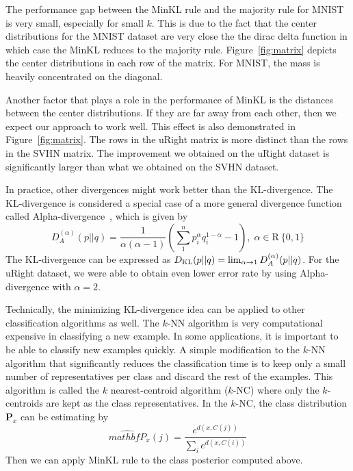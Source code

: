 \documentclass{article}
\begin{document}
The performance gap between the MinKL rule and the majority rule for
MNIST is very small, especially for small $k$. This is due to the fact that the center
distributions for the MNIST dataset are very close the the dirac delta
function in which case the MinKL reduces to the majority
rule. Figure~\ref{fig:matrix} depicts the center distributions in each
row of the matrix. For MNIST, the mass is heavily concentrated on the
diagonal.

Another factor that plays a role in the performance of MinKL is the
distances between the center distributions. If they are far away from
each other, then we expect our approach to work well. This effect is
also demonstrated in Figure~\ref{fig:matrix}. The rows in the uRight
matrix is more distinct than the rows in the SVHN matrix. The
improvement we obtained on the uRight dataset is significantly larger
than what we obtained on the SVHN dataset.

In practice, other divergences might work better than the
KL-divergence. The KL-divergence is considered a special case of a
more general divergence function called
Alpha-divergence~\cite{Cichocki2010}, which is given by
\[
D^{(\alpha)}_A (p||q) = \frac{1}{\alpha(\alpha - 1)}\left( \sum_1^n
  p^{\alpha}_i q^{1-\alpha}_i - 1\right), \; \alpha \in \mathrm{R} \ \{0,1\}
\]
The KL-divergence can be expressed as $D_{\mathrm{KL}}(p || q) = \lim_{\alpha
  \rightarrow 1} D^{(\alpha)}_A (p || q)$.  For the uRight dataset, we
were able to obtain even lower error rate by using Alpha-divergence
with $\alpha = 2$.

Technically, the minimizing KL-divergence idea can be applied to other
classification algorithms as well. The $k$-NN algorithm is very
computational expensive in classifying a new example. In some
applications, it is important to be able to classify new examples
quickly. A simple modification to the $k$-NN algorithm that
significantly reduces the classification time is to keep only a small
number of representatives per class and discard the rest of the
examples. This algorithm is called the $k$ nearest-centroid algorithm
($k$-NC) where only the $k$-centroids are kept as the class
representatives. In the $k$-NC, the class distribution $\mathbf{P}_x$
can be estimating by
\[
\widehat{mathbf{P}}_x(j) = \frac{e^{d(x,C(j))}}{\sum_i e^{d(x, C(i))} }
\]
Then we can apply MinKL rule to the class posterior computed above. 
\end{document}
